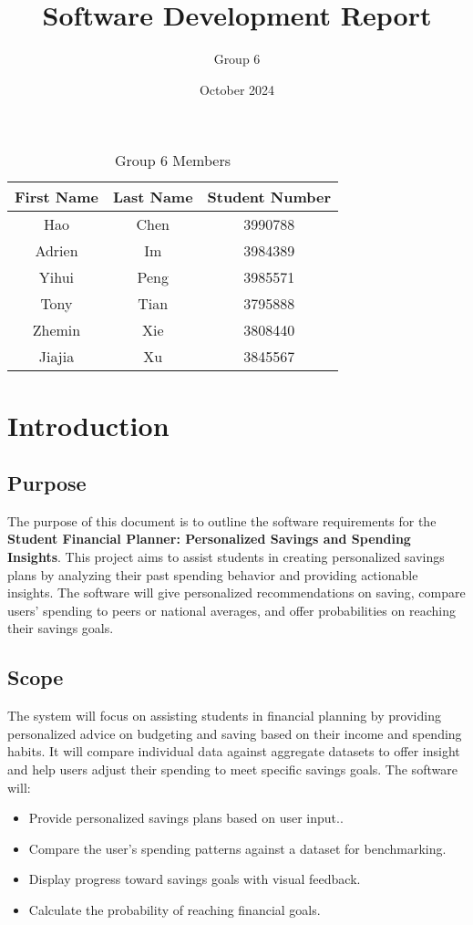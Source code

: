\documentclass{article}
\title{Software Development Report}
\author{Group 6}
\date{October 2024}
\begin{document}
\maketitle

\begin{table}[ht]
    \centering
    \begin{tabular}{ccc} 
    \toprule
    \textbf{First Name} & \textbf{Last Name} & \textbf{Student Number} \\ 
    \midrule
    Hao    & Chen     & 3990788 \\ 
    Adrien & Im       & 3984389 \\
    Yihui  & Peng     & 3985571 \\ 
    Tony   & Tian     & 3795888 \\ 
    Zhemin & Xie      & 3808440 \\ 
    Jiajia & Xu       & 3845567 \\ 
    \bottomrule 
    \end{tabular}
    \caption{Group 6 Members}
    \label{tab:group6_members}
\end{table}

\section{Introduction}
\subsection{Purpose}
The purpose of this document is to outline the software requirements for the \textbf{Student Financial Planner: Personalized Savings and Spending Insights}. This project aims to assist students in creating personalized savings plans by analyzing their past spending behavior and providing actionable insights. The software will give personalized recommendations on saving, compare users' spending to peers or national averages, and offer probabilities on reaching their savings goals.

\subsection{Scope}
The system will focus on assisting students in financial planning by providing personalized advice on budgeting and saving based on their income and spending habits. It will compare individual data against aggregate datasets to offer insight and help users adjust their spending to meet specific savings goals. The software will:
\begin{itemize}
    \item Provide personalized savings plans based on user input..
    \item Compare the user's spending patterns against a dataset for benchmarking.
    \item Display progress toward savings goals with visual feedback.
    \item Calculate the probability of reaching financial goals.
\end{itemize}
\end{document}
